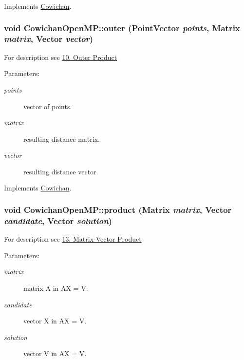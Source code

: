 Implements \hyperlink{class_cowichan_3df21e3c627958114e045c3559a29f30}{Cowichan}.\hypertarget{class_cowichan_open_m_p_99a0570f754ac82968d73093476de533}{
\subsubsection[{outer}]{\setlength{\rightskip}{0pt plus 5cm}void CowichanOpenMP::outer ({\bf PointVector} {\em points}, \/  {\bf Matrix} {\em matrix}, \/  {\bf Vector} {\em vector})}}
\label{class_cowichan_open_m_p_99a0570f754ac82968d73093476de533}


For description see \hyperlink{index_outer_sec}{10. Outer Product} \begin{Desc}
\item[Parameters:]
\begin{description}
\item[{\em points}]vector of points. \item[{\em matrix}]resulting distance matrix. \item[{\em vector}]resulting distance vector. \end{description}
\end{Desc}


Implements \hyperlink{class_cowichan_52f17221019290b88334b0ca7f3bcdb9}{Cowichan}.\hypertarget{class_cowichan_open_m_p_41d0067382570d1e784f62f2c5963d49}{
\subsubsection[{product}]{\setlength{\rightskip}{0pt plus 5cm}void CowichanOpenMP::product ({\bf Matrix} {\em matrix}, \/  {\bf Vector} {\em candidate}, \/  {\bf Vector} {\em solution})}}
\label{class_cowichan_open_m_p_41d0067382570d1e784f62f2c5963d49}


For description see \hyperlink{index_product_sec}{13. Matrix-Vector Product} \begin{Desc}
\item[Parameters:]
\begin{description}
\item[{\em matrix}]matrix A in AX = V. \item[{\em candidate}]vector X in AX = V. \item[{\em solution}]vector V in AX = V. \end{description}
\end{Desc}


